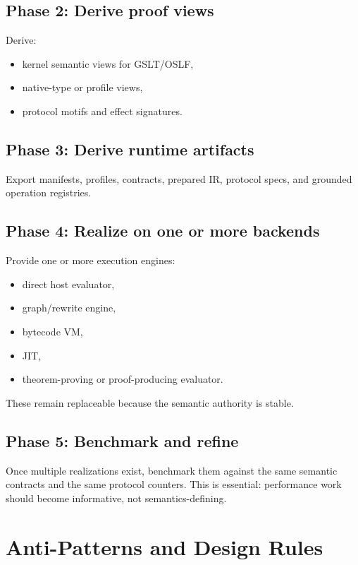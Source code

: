 \documentclass[11pt]{article}
\begin{document}
\subsection{Phase 2: Derive proof views}

Derive:
\begin{itemize}[leftmargin=2em]
  \item kernel semantic views for GSLT/OSLF,
  \item native-type or profile views,
  \item protocol motifs and effect signatures.
\end{itemize}

\subsection{Phase 3: Derive runtime artifacts}

Export manifests, profiles, contracts, prepared IR, protocol specs, and grounded operation registries.

\subsection{Phase 4: Realize on one or more backends}

Provide one or more execution engines:
\begin{itemize}[leftmargin=2em]
  \item direct host evaluator,
  \item graph/rewrite engine,
  \item bytecode VM,
  \item JIT,
  \item theorem-proving or proof-producing evaluator.
\end{itemize}

These remain replaceable because the semantic authority is stable.

\subsection{Phase 5: Benchmark and refine}

Once multiple realizations exist, benchmark them against the same semantic contracts and the same protocol counters. This is essential: performance work should become informative, not semantics-defining.

\section{Anti-Patterns and Design Rules}
\end{document}
